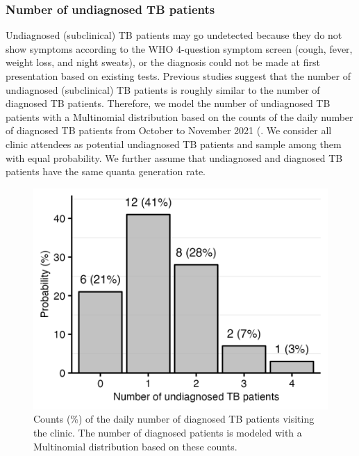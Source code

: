 \documentclass[fleqn,11pt]{wlscirep_supp}
\begin{document}
\subsubsection{Number of undiagnosed TB patients}

Undiagnosed (subclinical) TB patients may go undetected because they do not show symptoms according to the WHO 4-question symptom screen (cough, fever, weight loss, and night sweats)\cite{Berhanu2023CID}, or the diagnosis could not be made at first presentation based on existing tests\cite{Patterson2024PNAS}. Previous studies suggest that the number of undiagnosed (subclinical) TB patients is roughly similar to the number of diagnosed TB patients\cite{Berhanu2023CID,Moyo2022LancetID}. Therefore, we model the number of undiagnosed TB patients with a Multinomial distribution based on the counts of the daily number of diagnosed TB patients from October to November 2021 (. We consider all clinic attendees as potential undiagnosed TB patients and sample among them with equal probability. We further assume that undiagnosed and diagnosed TB patients have the same quanta generation rate.

\begin{figure}[!htpb]
    \centering
    \includegraphics{results/inputs/undiagnosed-tb-patients.png}
    \caption[Counts of the daily number of diagnosed TB patients visiting the clinic]{Counts (\%) of the daily number of diagnosed TB patients visiting the clinic. The number of diagnosed patients is modeled with a Multinomial distribution based on these counts.}
    \label{fig:undiagnosed-distribution}
\end{figure}
\end{document}
